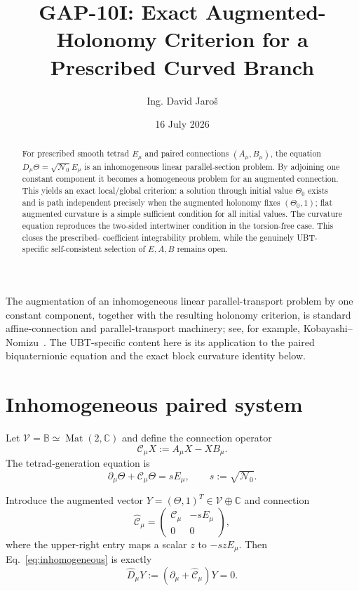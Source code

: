 \documentclass[12pt,a4paper]{article}
\title{GAP-10I: Exact Augmented-Holonomy Criterion for a Prescribed Curved Branch}
\author{Ing. David Jaro\v{s}}
\date{16 July 2026}
\theoremstyle{remark}\newtheorem{remark}[definition]{Remark}
\newcommand{\B}{\mathbb B}
\begin{document}
\maketitle
\UBTProvenanceNotice

\begin{abstract}
For prescribed smooth tetrad $E_\mu$ and paired connections $(A_\mu,B_\mu)$,
the equation $D_\mu\Theta=\sqrt{\mathcal N_0}E_\mu$ is an inhomogeneous
linear parallel-section problem.  By adjoining one constant component it
becomes a homogeneous problem for an augmented connection.  This yields an
exact local/global criterion: a solution through initial value $\Theta_0$
exists and is path independent precisely when the augmented holonomy fixes
$(\Theta_0,1)$; flat augmented curvature is a simple sufficient condition for
all initial values.  The curvature equation reproduces the two-sided
intertwiner condition in the torsion-free case.  This closes the prescribed-
coefficient integrability problem, while the genuinely UBT-specific
self-consistent selection of $E,A,B$ remains open.
\end{abstract}

The augmentation of an inhomogeneous linear parallel-transport problem by one
constant component, together with the resulting holonomy criterion, is standard
affine-connection and parallel-transport machinery; see, for example,
Kobayashi--Nomizu~\cite{kobayashi_nomizu_1963}.  The UBT-specific content here
is its application to the paired biquaternionic equation and the exact block
curvature identity below.

\section{Inhomogeneous paired system}
Let $\mathcal V=\B\simeq\operatorname{Mat}(2,\mathbb C)$ and define the
connection operator
\begin{equation}
 \mathcal C_\mu X:=A_\mu X-XB_\mu.
\end{equation}
The tetrad-generation equation is
\begin{equation}
 \partial_\mu\Theta+\mathcal C_\mu\Theta
 =sE_\mu,\qquad s:=\sqrt{\mathcal N_0}.
 \label{eq:inhomogeneous}
\end{equation}

Introduce the augmented vector $Y=(\Theta,1)^T\in\mathcal V\oplus\mathbb C$
and connection
\begin{equation}
 \widehat{\mathcal C}_\mu=
 \begin{pmatrix}
  \mathcal C_\mu & -sE_\mu\\
  0&0
 \end{pmatrix},
 \label{eq:augmented-connection}
\end{equation}
where the upper-right entry maps a scalar $z$ to $-szE_\mu$.  Then
Eq.~\eqref{eq:inhomogeneous} is exactly
\begin{equation}
 \widehat D_\mu Y:=
 (\partial_\mu+\widehat{\mathcal C}_\mu)Y=0.
 \label{eq:parallel-Y}
\end{equation}
\end{document}
